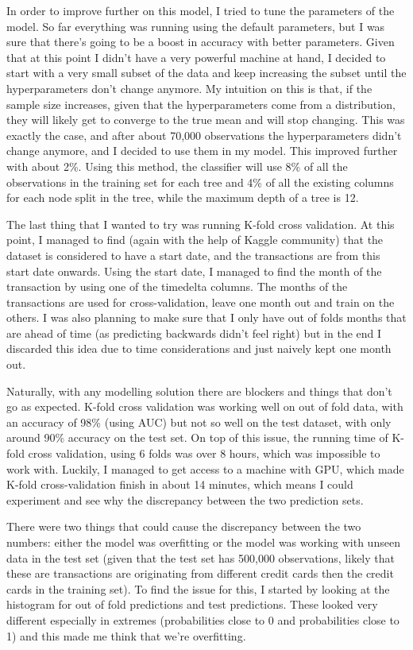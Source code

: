 \documentclass[11pt,a4paper]{article}
\begin{document}
In order to improve further on this model, I tried to tune the parameters of the model. So far everything was running using the default parameters, but I was sure that there's going to be a boost in accuracy with better parameters. Given that at this point I didn't have a very powerful machine at hand, I decided to start with a very small subset of the data and keep increasing the subset until the hyperparameters don't change anymore. My intuition on this is that, if the sample size increases, given that the hyperparameters come from a distribution, they will likely get to converge to the true mean and will stop changing. This was exactly the case, and after about 70,000 observations the hyperparameters didn't change anymore, and I decided to use them in my model. This improved further with about 2\%. Using this method, the classifier will use 8\% of all the observations in the training set for each tree and 4\% of all the existing columns for each node split in the tree, while the maximum depth of a tree is 12.

The last thing that I wanted to try was running K-fold cross validation. At this point, I managed to find (again with the help of Kaggle community) that the dataset is considered to have a start date, and the transactions are from this start date onwards. Using the start date, I managed to find the month of the transaction by using one of the timedelta columns. The months of the transactions are used for cross-validation, leave one month out and train on the others. I was also planning to make sure that I only have out of folds months that are ahead of time (as predicting backwards didn't feel right) but in the end I discarded this idea due to time considerations and just naively kept one month out. 

Naturally, with any modelling solution there are blockers and things that don't go as expected. K-fold cross validation was working well on out of fold data, with an accuracy of 98\% (using AUC) but not so well on the test dataset, with only around 90\% accuracy on the test set. On top of this issue, the running time of K-fold cross validation, using 6 folds was over 8 hours, which was impossible to work with. Luckily, I managed to get access to a machine with GPU, which made K-fold cross-validation finish in about 14 minutes, which means I could experiment and see why the discrepancy between the two prediction sets. 

There were two things that could cause the discrepancy between the two numbers: either the model was overfitting or the model was working with unseen data in the test set (given that the test set has 500,000 observations, likely that these are transactions are originating from different credit cards then the credit cards in the training set).
To find the issue for this, I started by looking at the histogram for out of fold predictions and test predictions. These looked very different especially in extremes (probabilities close to 0 and probabilities close to 1) and this made me think that we're overfitting. 
\end{document}

